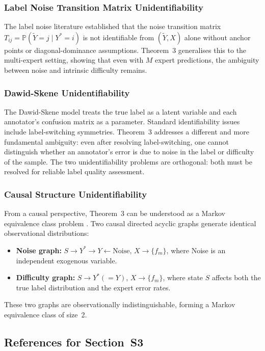 \subsubsection{Label Noise Transition Matrix Unidentifiability}

The label noise literature \cite{menon2015learning,patrini2017making}
established that the noise transition matrix $T_{ij}=\mathbb{P}(\tilde Y=j\mid
Y^*=i)$ is not identifiable from $(\tilde Y,X)$ alone without anchor points or
diagonal-dominance assumptions.  Theorem~3 generalises this to the multi-expert
setting, showing that even with $M$ expert predictions, the ambiguity between
noise and intrinsic difficulty remains.

\subsubsection{Dawid-Skene Unidentifiability}

The Dawid-Skene model \cite{dawid1979maximum} treats the true label as a latent
variable and each annotator's confusion matrix as a parameter.  Standard
identifiability issues include label-switching symmetries.  Theorem~3 addresses
a different and more fundamental ambiguity: even after resolving
label-switching, one cannot distinguish whether an annotator's error is due to
noise in the label or difficulty of the sample.  The two unidentifiability
problems are orthogonal: both must be resolved for reliable label quality
assessment.

\subsubsection{Causal Structure Unidentifiability}

From a causal perspective, Theorem~3 can be understood as a Markov equivalence
class problem \cite{pearl2009causality}.  Two causal directed acyclic graphs
generate identical observational distributions:
\begin{itemize}
  \item \textbf{Noise graph:} $S\to Y^*\to Y\leftarrow\text{Noise}$,
    $X\to\{f_m\}$, where Noise is an independent exogenous variable.
  \item \textbf{Difficulty graph:} $S\to Y^*(=Y)$, $X\to\{f_m\}$, where state
    $S$ affects both the true label distribution and the expert error rates.
\end{itemize}
These two graphs are observationally indistinguishable, forming a
Markov equivalence class of size~2.

\subsection*{References for Section~S3}

\begingroup
\small


\endgroup

\endinput
